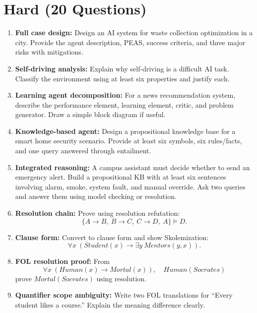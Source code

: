 \documentclass[11pt,a4paper]{article}
\begin{document}
\section*{Hard (20 Questions)}
\begin{enumerate}[label=H\arabic*., leftmargin=*]
  \item \textbf{Full case design:} Design an AI system for waste collection optimization in a city.
    Provide the agent description, PEAS, success criteria, and three major risks with mitigations.

  \item \textbf{Self-driving analysis:} Explain why self-driving is a difficult AI task.
    Classify the environment using at least six properties and justify each.

  \item \textbf{Learning agent decomposition:} For a news recommendation system, describe the performance element,
    learning element, critic, and problem generator. Draw a simple block diagram if useful.

  \item \textbf{Knowledge-based agent:} Design a propositional knowledge base for a smart home security scenario.
    Provide at least six symbols, six rules/facts, and one query answered through entailment.

  \item \textbf{Integrated reasoning:} A campus assistant must decide whether to send an emergency alert.
    Build a propositional KB with at least six sentences involving alarm, smoke, system fault, and manual override.
    Ask two queries and answer them using model checking or resolution.

  \item \textbf{Resolution chain:} Prove using resolution refutation:
    \[
      \{A \rightarrow B,\ B \rightarrow C,\ C \rightarrow D,\ A\} \models D.
    \]

  \item \textbf{Clause form:} Convert to clause form and show Skolemization:
    \[
      \forall x\ (Student(x) \rightarrow \exists y\ Mentors(y,x)).
    \]

  \item \textbf{FOL resolution proof:} From
    \[
      \forall x\ (Human(x) \rightarrow Mortal(x)), \quad Human(Socrates)
    \]
    prove $Mortal(Socrates)$ using resolution.

  \item \textbf{Quantifier scope ambiguity:} Write two FOL translations for
    ``Every student likes a course.''
    Explain the meaning difference clearly.


\end{enumerate}
\end{document}
